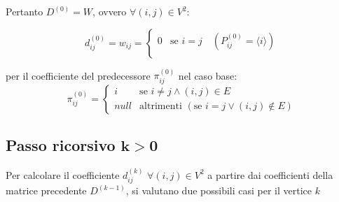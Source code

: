 Pertanto $D^{(0)} = W$, ovvero $\forall(i,j) \in V^2$:

{
    \large

    $$
    d_{ij}^{(0)} = w_{ij} = 
    \begin{cases}
        0 & \text{se } i=j \quad (P_{ij}^{(0)} = \langle i \rangle) \\
    \end{cases} 
    $$
}

per il coefficiente del predecessore $\pi_{ij}^{(0)}$ nel caso base:
{
    \large
    $$
        \pi_{ij}^{(0)} = 
        \begin{cases}
            i & \text{se } i \not = j \land (i,j) \in E \\
            null & \text{altrimenti } (\text{se } i=j \lor (i,j) \not \in E)
        \end{cases}
    $$
}

\subsection{Passo ricorsivo $\mathbf{k>0}$}
Per calcolare il coefficiente $d_{ij}^{(k)}$ $\forall(i,j) \in V^2$ a partire dai coefficienti della matrice precedente $D^{(k-1)}$, si valutano due possibili casi per il vertice $k$ 

